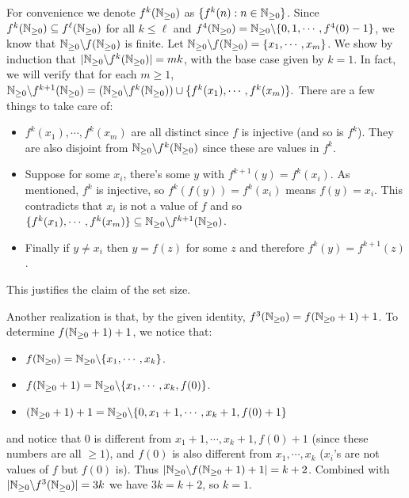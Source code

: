 \documentclass[11pt,a4paper]{article}
\begin{document}
\begin{enumerate}
	For convenience we denote $f^k(\mathbb{N}_{\ge 0})$ as $\{f^k(n): n\in \mathbb{N}_{\ge 0}\}$. 
	Since $f^k(\mathbb{N}_{\ge 0})\subseteq f^{\ell}(\mathbb{N}_{\ge 0})$ for all $k\le \ell$ and $f^4(\mathbb{N}_{\ge 0})=\mathbb{N}_{\ge 0}\backslash \{0, 1, \cdots , f^4(0)-1\}$, we know that $\mathbb{N}_{\ge 0}\backslash f(\mathbb{N}_{\ge 0})$ is finite. 
	Let $\mathbb{N}_{\ge 0}\backslash f(\mathbb{N}_{\ge 0}) = \{x_1, \cdots , x_m\}$. 
	We show by induction that $|\mathbb{N}_{\ge 0}\backslash f^k(\mathbb{N}_{\ge 0})| = mk$, with the base case given by $k=1$. 
	In fact, we will verify that for each $m\ge 1$, $\mathbb{N}_{\ge 0}\backslash f^{k+1}(\mathbb{N}_{\ge 0}) = (\mathbb{N}_{\ge 0}\backslash f^{k}(\mathbb{N}_{\ge 0}))\cup \{f^k(x_1), \cdots , f^k(x_m)\}.$ There are a few things to take care of: 
	\begin{itemize}
		\item $f^k(x_1), \cdots , f^k(x_m)$ are all distinct since $f$ is injective (and so is $f^k$). They are also disjoint from $\mathbb{N}_{\ge 0}\backslash f^{k}(\mathbb{N}_{\ge 0})$ since these are values in $f^k$. 
		
		\item Suppose for some $x_i$, there's some $y$ with $f^{k+1}(y)=f^k(x_i)$. 
		As mentioned, $f^k$ is injective, so $f^k(f(y)) = f^k(x_i)$ means $f(y)=x_i$. This contradicts that $x_i$ is not a value of $f$ and so $\{f^k(x_1), \cdots , f^k(x_m)\}\subseteq \mathbb{N}_{\ge 0}\backslash f^{k+1}(\mathbb{N}_{\ge 0})$. 
		
		\item Finally if $y\neq x_i$ then $y=f(z)$ for some $z$ and therefore $f^k (y)=f^{k+1}(z)$. 
	\end{itemize}
	This justifies the claim of the set size. 
	
	Another realization is that, by the given identity, $f^3(\mathbb{N}_{\ge 0})=f(\mathbb{N}_{\ge 0} +1 )+1$. 
	To determine $f(\mathbb{N}_{\ge 0} +1 )+1$, we notice that: 
	\begin{itemize}
		\item $f(\mathbb{N}_{\ge 0}) = \mathbb{N}_{\ge 0}\backslash \{x_1, \cdots , x_k\}$. 
		
		\item $f(\mathbb{N}_{\ge 0} +1) = \mathbb{N}_{\ge 0}\backslash \{x_1, \cdots , x_k, f(0)\}$. 
		
		\item $(\mathbb{N}_{\ge 0} +1)+1 = \mathbb{N}_{\ge 0}\backslash \{0, x_1+1, \cdots , x_k+1, f(0)+1\}$
	\end{itemize}
    and notice that $0$ is different from $x_1+1, \cdots , x_k+1, f(0)+1$ (since these numbers are all $\ge 1$), and $f(0)$ is also different from $x_1, \cdots , x_k$ ($x_i$'s are not values of $f$ but $f(0)$ is). 
    Thus $|\mathbb{N}_{\ge 0}\backslash f(\mathbb{N}_{\ge 0} +1 )+1| = k + 2$. Combined with $|\mathbb{N}_{\ge 0}\backslash f^3(\mathbb{N}_{\ge 0})| = 3k$ we have $3k=k+2$, so $k=1$. 
    

\end{enumerate}
\end{document}
